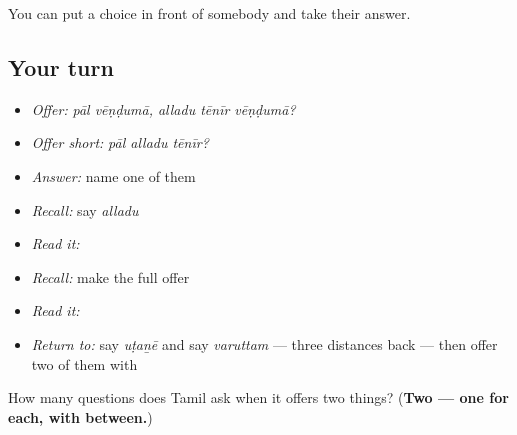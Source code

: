 \begin{grammarlens}[title={What you've built}]
You can put a choice in front of somebody and take their answer.
\end{grammarlens}

\subsection*{Your turn}
\begin{itemize}
\raggedright
  \item \emph{Offer:} \emph{pāl vēṇḍumā, alladu tēnīr vēṇḍumā?}
  \item \emph{Offer short:} \emph{pāl alladu tēnīr?}
  \item \emph{Answer:} name one of them
  \item \emph{Recall:} say \emph{alladu}
  \item \emph{Read it:} \textbf{}
  \item \emph{Recall:} make the full offer
  \item \emph{Read it:} \textbf{}
  \item \emph{Return to:} say \emph{uṭaṉē} and say \emph{varuttam} — three distances back — then offer two of them with 
\end{itemize}

\begin{tcolorbox}[breakable,colback=teal!4,colframe=teal!35!black,title={Before you move on}]
How many questions does Tamil ask when it offers two things? (\textbf{Two — one for each, with  between.})
\end{tcolorbox}
